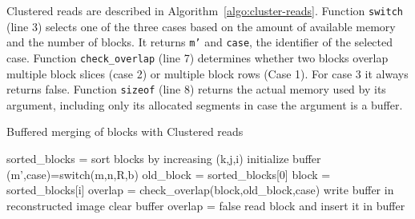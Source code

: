 \documentclass[10pt, conference, compsocconf]{IEEEtran}
\begin{document}
Clustered reads are described in
Algorithm~\ref{algo:cluster-reads}. Function \texttt{switch} (line 3)
selects one of the three cases based on the amount of available memory
and the number of blocks. It returns \texttt{m'} and \texttt{case},
the identifier of the selected case. Function \texttt{check\_overlap}
(line 7) determines whether two blocks overlap multiple block slices
(case 2) or multiple block rows (Case 1). For case 3 it always returns
false.  Function \texttt{sizeof} (line 8) returns the actual memory
used by its argument, including only its allocated segments in case
the argument is a buffer.
\begin{algorithm}[h]
  \caption{Buffered merging of blocks with Clustered reads}
  \label{algo:cluster-reads}
  \begin{algorithmic}[1]
    \STATE sorted\_blocks = sort blocks by increasing (k,j,i)
    \STATE initialize buffer
    \STATE (m',case)=switch(m,n,R,b)
    \STATE old\_block = sorted\_blocks[0]
      \STATE block = sorted\_blocks[i]
      \STATE overlap = check\_overlap(block,old\_block,case)
      \STATE write buffer in reconstructed image
      \STATE clear buffer
      \STATE overlap = false
      \ENDIF
      \STATE read block and insert it in buffer
      \ENDFOR
  \end{algorithmic}
\end{algorithm}
\end{document}
